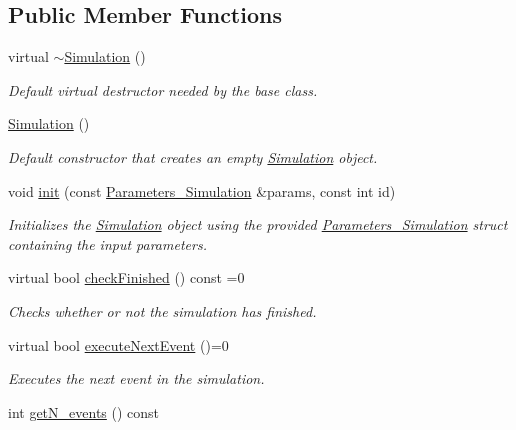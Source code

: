 \subsection*{Public Member Functions}
\begin{DoxyCompactItemize}
\item 
\mbox{\label{class_simulation_a80fad3f57dfaf195a36f7bc49bc88279}} 
virtual \hyperlink{class_simulation_a80fad3f57dfaf195a36f7bc49bc88279}{$\sim$\+Simulation} ()
\begin{DoxyCompactList}\small\item\em Default virtual destructor needed by the base class. \end{DoxyCompactList}\item 
\hyperlink{class_simulation_a5b224cc5b36bcc8eb29689aff223de41}{Simulation} ()
\begin{DoxyCompactList}\small\item\em Default constructor that creates an empty \hyperlink{class_simulation}{Simulation} object. \end{DoxyCompactList}\item 
void \hyperlink{class_simulation_af88e5e0634b373ba28f1dd87670725a6}{init} (const \hyperlink{struct_parameters___simulation}{Parameters\+\_\+\+Simulation} \&params, const int id)
\begin{DoxyCompactList}\small\item\em Initializes the \hyperlink{class_simulation}{Simulation} object using the provided \hyperlink{struct_parameters___simulation}{Parameters\+\_\+\+Simulation} struct containing the input parameters. \end{DoxyCompactList}\item 
virtual bool \hyperlink{class_simulation_af69bb46977a3a0084214a194c888e16c}{check\+Finished} () const =0
\begin{DoxyCompactList}\small\item\em Checks whether or not the simulation has finished. \end{DoxyCompactList}\item 
virtual bool \hyperlink{class_simulation_a48e9e82f9dac1acec5d063a9f6f6115e}{execute\+Next\+Event} ()=0
\begin{DoxyCompactList}\small\item\em Executes the next event in the simulation. \end{DoxyCompactList}\item 
int \hyperlink{class_simulation_a7d88f18a1ba988d7e77b8be8de5b10d1}{get\+N\+\_\+events} () const

\end{DoxyCompactItemize}
